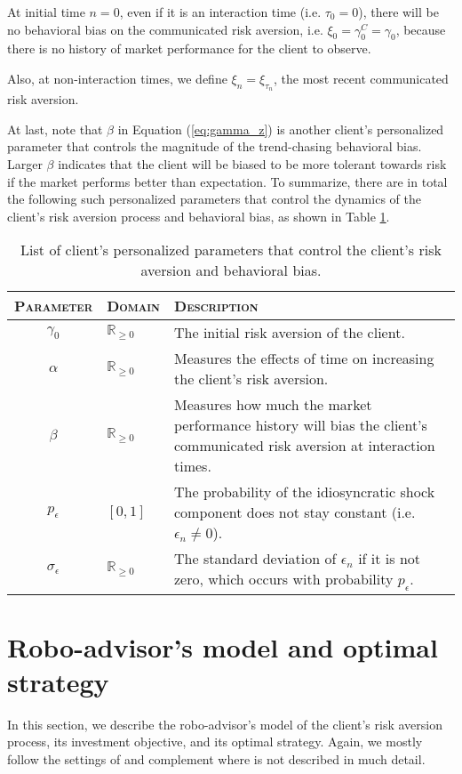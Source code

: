 At initial time $n=0$, even if it is an interaction time (i.e. $\tau_0=0$), there will be no behavioral bias on the communicated risk aversion, i.e. $\xi_0=\gamma_0^C=\gamma_0$, because there is no history of market performance for the client to observe.

Also, at non-interaction times, we define $\xi_n=\xi_{\tau_n}$, the most recent communicated risk aversion.

At last, note that $\beta$ in Equation (\ref{eq:gamma_z}) is another client's personalized parameter that controls the magnitude of the trend-chasing behavioral bias. Larger $\beta$ indicates that the client will be biased to be more tolerant towards risk if the market performs better than expectation. To summarize, there are in total the following such personalized parameters that control the dynamics of the client's risk aversion process and behavioral bias, as shown in Table \ref{tab:param}. 

\begin{table}[t]
\centering
\begin{tabular}{clp{8cm}}
\toprule
\textsc{Parameter} & \textsc{Domain} & \textsc{Description}\\
\midrule
$\gamma_0$ &$\mathbb{R}_{\geq0}$& The initial risk aversion of the client.\\
$\alpha$ &$\mathbb{R}_{\geq0}$& Measures the effects of time on increasing the client's risk aversion.\\
$\beta$ &$\mathbb{R}_{\geq0}$& Measures how much the market performance history will bias the client's communicated risk aversion at interaction times.\\
$p_\epsilon$ &$[0,1]$& The probability of the idiosyncratic shock component does not stay constant (i.e. $\epsilon_n\neq0$). \\
$\sigma_\epsilon$ &$\mathbb{R}_{\geq0}$& The standard deviation of $\epsilon_n$ if it is not zero, which occurs with probability $p_\epsilon$.\\
\bottomrule
\end{tabular}%
\caption{List of client's personalized parameters that control the client's risk aversion and behavioral bias.}
\label{tab:param}
\end{table}

\section{Robo-advisor's model and optimal strategy}\label{sec:robo_model}
In this section, we describe the robo-advisor's model of the client's risk aversion process, its investment objective, and its optimal strategy. Again, we mostly follow the settings of  and complement where is not described in much detail.

